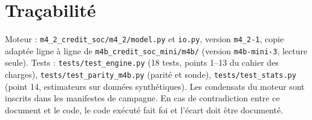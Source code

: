 \documentclass[11pt,a4paper]{article}
\newcommand{\code}[1]{\texttt{#1}}
\begin{document}
\section{Traçabilité}

Moteur : \code{m4\_2\_credit\_soc/m4\_2/model.py} et \code{io.py}, version
\code{m4\_2-1}, copie adaptée ligne à ligne de
\code{m4b\_credit\_soc\_mini/m4b/} (version \code{m4b-mini-3}, lecture
seule). Tests : \code{tests/test\_engine.py} (18 tests, points 1--13 du
cahier des charges), \code{tests/test\_parity\_m4b.py} (parité et sonde),
\code{tests/test\_stats.py} (point 14, estimateurs sur données
synthétiques). Les condensats du moteur sont inscrits dans les manifestes
de campagne. En cas de contradiction entre ce document et le code, le code
exécuté fait foi et l'écart doit être documenté.
\end{document}
